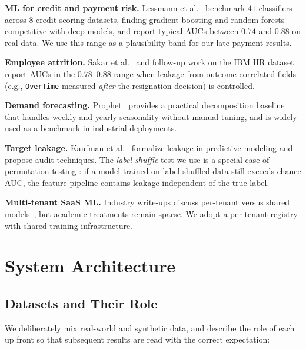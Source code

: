 \documentclass[conference]{IEEEtran}
\begin{document}
\textbf{ML for credit and payment risk.} Lessmann et al.~\cite{lessmann2015benchmarking}
benchmark $41$ classifiers across $8$ credit-scoring datasets, finding gradient
boosting and random forests competitive with deep models, and report typical
AUCs between $0.74$ and $0.88$ on real data. We use this range as a
plausibility band for our late-payment results.

\textbf{Employee attrition.} Sakar et al.~\cite{sakar2019machinelearning} and
follow-up work on the IBM HR dataset report AUCs in the $0.78$--$0.88$ range
when leakage from outcome-correlated fields (e.g., \texttt{OverTime} measured
\emph{after} the resignation decision) is controlled.

\textbf{Demand forecasting.} Prophet~\cite{taylor2018forecasting} provides a
practical decomposition baseline that handles weekly and yearly seasonality
without manual tuning, and is widely used as a benchmark in industrial
deployments.

\textbf{Target leakage.} Kaufman et al.~\cite{kaufman2012leakage} formalize
leakage in predictive modeling and propose audit techniques. The
\emph{label-shuffle} test we use is a special case of permutation testing
\cite{ojala2010permutation}: if a model trained on label-shuffled data still
exceeds chance AUC, the feature pipeline contains leakage independent of the
true label.

\textbf{Multi-tenant SaaS ML.} Industry write-ups discuss per-tenant versus
shared models~\cite{zhang2021multitenant}, but academic treatments remain
sparse. We adopt a per-tenant registry with shared training infrastructure.

\section{System Architecture}
\label{sec:architecture}

\subsection{Datasets and Their Role}
\label{sec:datasets}

We deliberately mix real-world and synthetic data, and describe the role of
each up front so that subsequent results are read with the correct
expectation:
\end{document}
